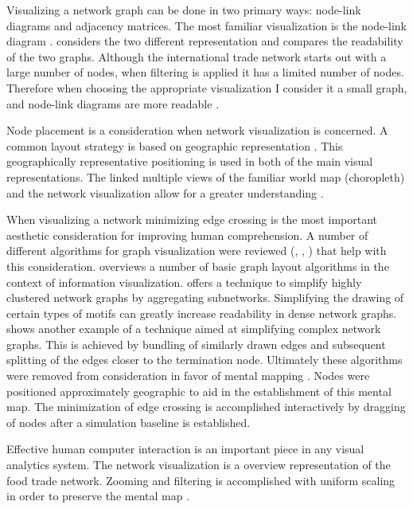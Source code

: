 Visualizing a network graph can be done in two primary ways: node-link diagrams and adjacency matrices. The most familiar visualization is the node-link diagram . \cite{ghoniem2004comparison} considers the two different representation and compares the readability of the two graphs. Although the international trade network starts out with a large number of nodes, when filtering is applied \citep{shneiderman1996eyes} it has a limited number of nodes. Therefore when choosing the appropriate visualization I consider it a small graph, and node-link diagrams are more readable \citep{ghoniem2004comparison}.\par
Node placement is a consideration when network visualization is concerned. A common layout strategy is based on geographic representation \citep{shneiderman2006network}. This geographically representative positioning is used in both of the main visual representations. The linked multiple views of the familiar world map (choropleth) and the network visualization allow for a greater understanding \citep{rodgers2005graph}.\par
When visualizing a network minimizing edge crossing is the most important aesthetic consideration \citep{purchase1997aesthetic} for improving human comprehension. A number of different algorithms for graph visualization were reviewed (\cite{herman2000graph}, \cite{dunne2013motif}, \cite{holten2009force}) that help with this consideration. \cite{herman2000graph} overviews a number of basic graph layout algorithms in the context of information visualization. \cite{dunne2013motif} offers a technique to simplify highly clustered network graphs by aggregating subnetworks. Simplifying the drawing of certain types of motifs can greatly increase readability in dense network graphs. \cite{holten2009force} shows another example of a technique aimed at simplifying complex network graphs. This is achieved by bundling of similarly drawn edges and subsequent splitting of the edges closer to the termination node. Ultimately these algorithms were removed from consideration in favor of mental mapping \citep{eades1991preserving}. Nodes were positioned approximately geographic to aid in the establishment of this mental map. The minimization of edge crossing is accomplished interactively by dragging of nodes after a simulation baseline is established.\par
Effective human computer interaction is an important piece in any visual analytics system. The network visualization is a overview representation of the food trade network. Zooming and filtering is accomplished with uniform scaling in order to preserve the mental map \citep{eades1991preserving}.



